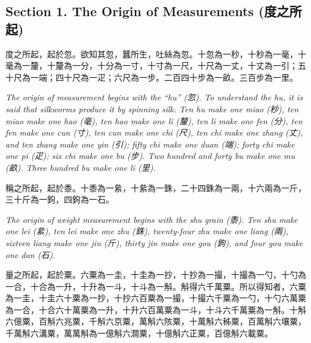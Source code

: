 \documentclass[11pt,a4paper]{article}
\newcommand{\zh}[1]{{\CJKfamily{}#1}}
\begin{document}
\subsection*{Section 1. The Origin of Measurements (\zh{度之所起})}

\begin{problembox}[title=\zh{度之所起}]
\zh{度之所起，起於忽。欲知其忽，蠶所生，吐絲為忽。十忽為一秒，十秒為一毫，十毫為一釐，十釐為一分，十分為一寸，十寸為一尺，十尺為一丈，十丈為一引；五十尺為一端；四十尺為一疋；六尺為一步。二百四十步為一畝。三百步為一里。}
\end{problembox}

\textit{The origin of measurement begins with the ``hu'' (\zh{忽}). To understand the hu, it is said that silkworms produce it by spinning silk. Ten hu make one miao (\zh{秒}), ten miao make one hao (\zh{毫}), ten hao make one li (\zh{釐}), ten li make one fen (\zh{分}), ten fen make one cun (\zh{寸}), ten cun make one chi (\zh{尺}), ten chi make one zhang (\zh{丈}), and ten zhang make one yin (\zh{引}); fifty chi make one duan (\zh{端}); forty chi make one pi (\zh{疋}); six chi make one bu (\zh{步}). Two hundred and forty bu make one mu (\zh{畝}). Three hundred bu make one li (\zh{里}).}

\vspace{0.3cm}

\begin{problembox}[title=\zh{稱之所起}]
\zh{稱之所起，起於黍。十黍為一絫，十絫為一銖，二十四銖為一兩，十六兩為一斤，三十斤為一鉤，四鉤為一石。}
\end{problembox}

\textit{The origin of weight measurement begins with the shu grain (\zh{黍}). Ten shu make one lei (\zh{絫}), ten lei make one zhu (\zh{銖}), twenty-four zhu make one liang (\zh{兩}), sixteen liang make one jin (\zh{斤}), thirty jin make one gou (\zh{鉤}), and four gou make one dan (\zh{石}).}

\vspace{0.3cm}

\begin{problembox}[title=\zh{量之所起}]
\zh{量之所起，起於粟。六粟為一圭，十圭為一抄，十抄為一撮，十撮為一勺，十勺為一合，十合為一升，十升為一斗，十斗為一斛。斛得六千萬粟。所以得知者，六粟為一圭，十圭六十粟為一抄，十抄六百粟為一撮，十撮六千粟為一勺，十勺六萬粟為一合，十合六十萬粟為一升，十升六百萬粟為一斗，十斗六千萬粟為一斛。十斛六億粟，百斛六兆粟，千斛六京粟，萬斛六陔粟，十萬斛六秭粟，百萬斛六壤粟，千萬斛六溝粟，萬萬斛為一億斛六澗粟，十億斛六正粟，百億斛六載粟。}
\end{problembox}
\end{document}
